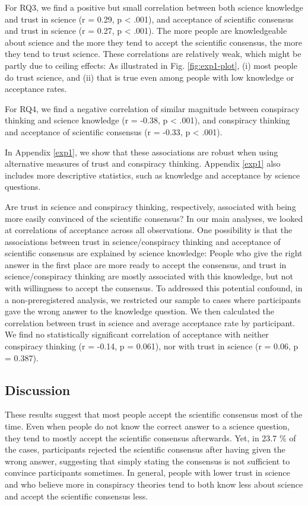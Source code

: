 \documentclass[
  doc,floatsintext]{apa6}
\begin{document}
For RQ3, we find a positive but small correlation between both science knowledge and trust in science (r = 0.29, p \textless{} .001), and acceptance of scientific consensus and trust in science (r = 0.27, p \textless{} .001). The more people are knowledgeable about science and the more they tend to accept the scientific consensus, the more they tend to trust science. These correlations are relatively weak, which might be partly due to ceiling effects: As illustrated in Fig. \ref{fig:exp1-plot}, (i) most people do trust science, and (ii) that is true even among people with low knowledge or acceptance rates.

For RQ4, we find a negative correlation of similar magnitude between conspiracy thinking and science knowledge (r = -0.38, p \textless{} .001), and conspiracy thinking and acceptance of scientific consensus (r = -0.33, p \textless{} .001).

In Appendix \ref{exp1}, we show that these associations are robust when using alternative measures of trust and conspiracy thinking. Appendix \ref{exp1} also includes more descriptive statistics, such as knowledge and acceptance by science questions.

Are trust in science and conspiracy thinking, respectively, associated with being more easily convinced of the scientific consensus? In our main analyses, we looked at correlations of acceptance across all observations. One possibility is that the associations between trust in science/conspiracy thinking and acceptance of scientific consensus are explained by science knowledge: People who give the right answer in the first place are more ready to accept the consensus, and trust in science/conspiracy thinking are mostly associated with this knowledge, but not with willingness to accept the consensus. To addressed this potential confound, in a non-preregistered analysis, we restricted our sample to cases where participants gave the wrong answer to the knowledge question. We then calculated the correlation between trust in science and average acceptance rate by participant. We find no statistically significant correlation of acceptance with neither conspiracy thinking (r = -0.14, p = 0.061), nor with trust in science (r = 0.06, p = 0.387).

\subsection{Discussion}\label{discussion-1}

These results suggest that most people accept the scientific consensus most of the time. Even when people do not know the correct answer to a science question, they tend to mostly accept the scientific consensus afterwards. Yet, in 23.7 \% of the cases, participants rejected the scientific consensus after having given the wrong answer, suggesting that simply stating the consensus is not sufficient to convince participants sometimes. In general, people with lower trust in science and who believe more in conspiracy theories tend to both know less about science and accept the scientific consensus less.
\end{document}
